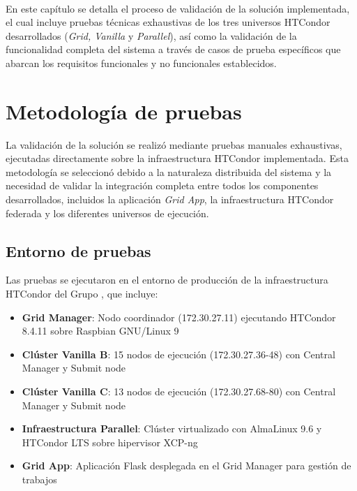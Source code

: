 \label{cap:validacion}
\mbox{}\\
En este capítulo se detalla el proceso de validación de la solución implementada, el cual incluye pruebas técnicas exhaustivas de los tres universos HTCondor desarrollados (\textit{Grid, Vanilla} y \textit{Parallel}), así como la validación de la funcionalidad completa del sistema a través de casos de prueba específicos que abarcan los requisitos funcionales y no funcionales establecidos.

\section{Metodología de pruebas}
\noindent

La validación de la solución se realizó mediante pruebas manuales exhaustivas, ejecutadas directamente sobre la infraestructura HTCondor implementada. Esta metodología se seleccionó debido a la naturaleza distribuida del sistema y la necesidad de validar la integración completa entre todos los componentes desarrollados, incluidos la aplicación \textit{Grid App}, la infraestructura HTCondor federada y los diferentes universos de ejecución.

\subsection{Entorno de pruebas}
\noindent

Las pruebas se ejecutaron en el entorno de producción de la infraestructura HTCondor del Grupo \GRID, que incluye:

\begin{itemize}
	\item \textbf{Grid Manager}: Nodo coordinador (172.30.27.11) ejecutando HTCondor 8.4.11 sobre Raspbian GNU/Linux 9
	\item \textbf{Clúster Vanilla B}: 15 nodos de ejecución (172.30.27.36-48) con Central Manager y Submit node
	\item \textbf{Clúster Vanilla C}: 13 nodos de ejecución (172.30.27.68-80) con Central Manager y Submit node
	\item \textbf{Infraestructura Parallel}: Clúster virtualizado con AlmaLinux 9.6 y HTCondor LTS sobre hipervisor XCP-ng
	\item \textbf{Grid App}: Aplicación Flask desplegada en el Grid Manager para gestión de trabajos
\end{itemize}

